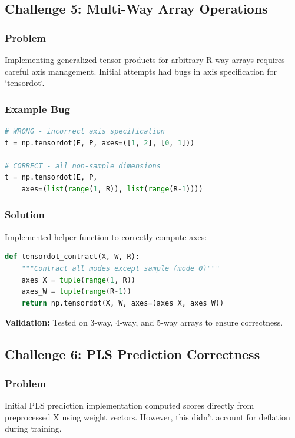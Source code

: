 \documentclass[12pt,a4paper]{article}
\begin{document}
\subsection{Challenge 5: Multi-Way Array Operations}

\subsubsection{Problem}
Implementing generalized tensor products for arbitrary R-way arrays requires careful axis management. Initial attempts had bugs in axis specification for `tensordot`.

\subsubsection{Example Bug}
\begin{lstlisting}[language=Python]
# WRONG - incorrect axis specification
t = np.tensordot(E, P, axes=([1, 2], [0, 1]))

# CORRECT - all non-sample dimensions
t = np.tensordot(E, P,
    axes=(list(range(1, R)), list(range(R-1))))
\end{lstlisting}

\subsubsection{Solution}
Implemented helper function to correctly compute axes:

\begin{lstlisting}[language=Python]
def tensordot_contract(X, W, R):
    """Contract all modes except sample (mode 0)"""
    axes_X = tuple(range(1, R))
    axes_W = tuple(range(R-1))
    return np.tensordot(X, W, axes=(axes_X, axes_W))
\end{lstlisting}

\textbf{Validation:} Tested on 3-way, 4-way, and 5-way arrays to ensure correctness.

\subsection{Challenge 6: PLS Prediction Correctness}

\subsubsection{Problem}
Initial PLS prediction implementation computed scores directly from preprocessed X using weight vectors. However, this didn't account for deflation during training.
\end{document}
